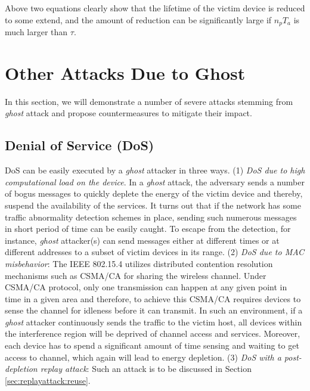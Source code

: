 \documentclass[10pt,journal,cspaper,compsoc]{IEEEtran}
\begin{document}
Above two equations clearly show that the lifetime of the victim device is reduced to some extend, and the amount of reduction can be significantly large if $n_p T_a$ is much larger than $\tau$.


\section {Other Attacks Due to Ghost}\label{otherattack}
In this section, we will demonstrate a number of severe attacks stemming from {\em ghost} attack and propose countermeasures to mitigate their impact.

\subsection{Denial of Service (DoS)}\label{sec:dos}
DoS can be easily executed by a {\em ghost} attacker in three ways. (1) {\em DoS due to high computational load on the device}. In a {\em ghost} attack, the adversary sends a number of bogus messages  to quickly deplete the energy of the victim device and thereby, suspend the availability of the services. It turns out that if the network has some  traffic abnormality detection schemes in place, sending such numerous messages in short period of time can be easily caught. To escape from the detection, for instance, {\em ghost} attacker(s) can send messages either at different times or at different addresses to a subset of victim devices in its range. (2) {\em DoS due to MAC misbehavior}: The IEEE 802.15.4 utilizes distributed contention resolution mechanisms such as CSMA/CA for sharing the wireless channel. Under CSMA/CA protocol, only one transmission can happen at any given point in time in a given area and therefore, to achieve this CSMA/CA requires devices to sense the channel for idleness before it can transmit. In such an environment,  if a {\em ghost} attacker continuously sends the traffic to the victim host, all devices within the interference region will be deprived of channel access and services. Moreover, each device has to spend a significant amount of time sensing and waiting to get access to channel, which again will lead to energy depletion. (3) {\em DoS with a post-depletion replay attack}: Such an attack is to be discussed in Section \ref{sec:replayattack:reuse}.
\end{document}
